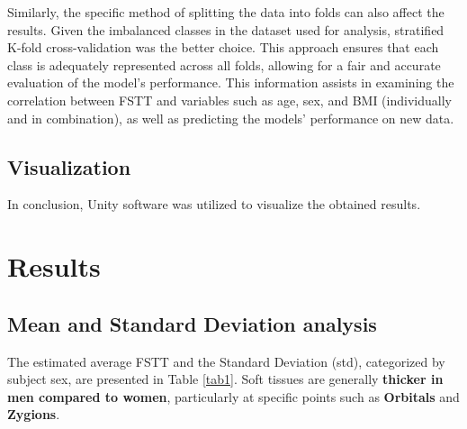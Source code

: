 \documentclass[journal,article,submit,pdftex,moreauthors]{Definitions/mdpi}
\begin{document}
Similarly, the specific method of splitting the data into folds can also affect the results. Given the imbalanced classes in the dataset used for analysis, stratified K-fold cross-validation was the better choice.
This approach ensures that each class is adequately represented across all folds, allowing for a fair and accurate evaluation of the model’s performance. This information assists in examining the correlation between FSTT and variables such as age, sex, and BMI (individually and in combination), as well as predicting the models' performance on new data.

\subsection{Visualization}

In conclusion, Unity software was utilized to visualize the obtained results.

\section{Results}
\label{sec:res}


\subsection*{Mean and Standard Deviation analysis}
The estimated average FSTT and the Standard Deviation (std), categorized by subject sex, are presented in Table \ref{tab1}. Soft tissues are generally \textbf{thicker in men compared to women}, particularly at specific points such as \textbf{Orbitals} and \textbf{Zygions}.
\end{document}
